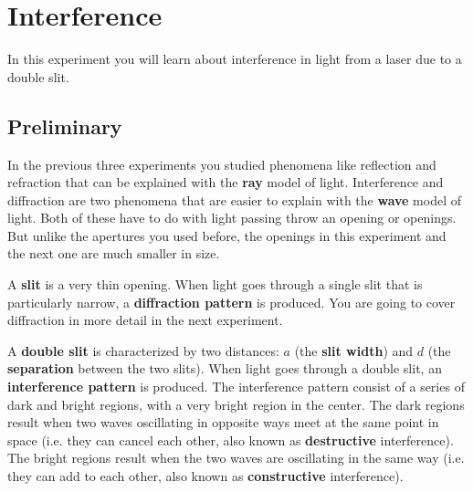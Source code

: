 \setcounter{chapter}{9}
\chapter{Interference}
%
In this experiment you will learn about interference in light from a laser due to a double slit.
%
\section{Preliminary}
%
In the previous three experiments you studied phenomena like reflection and refraction that can be explained with the \textbf{ray} model of light. Interference and diffraction are two phenomena that are easier to explain with the \textbf{wave} model of light. Both of these have to do with light passing throw an opening or openings. But unlike the apertures you used before, the openings in this experiment and the next one are much smaller in size.

A \textbf{slit} is a very thin opening. When light goes through a single slit that is particularly narrow, a \textbf{diffraction pattern} is produced. You are going to cover diffraction in more detail in the next experiment.

A \textbf{double slit} is characterized by two distances: $a$ (the \textbf{slit width}) and $d$ (the \textbf{separation} between the two slits). When light goes through a double slit, an \textbf{interference pattern} is produced. The interference pattern consist of a series of dark and bright regions, with a very bright region in the center. The dark regions result when two waves oscillating in opposite ways meet at the same point in space (i.e. they can cancel each other, also known as \textbf{destructive} interference). The bright regions result when the two waves are oscillating in the same way (i.e. they can add to each other, also known as \textbf{constructive} interference).

